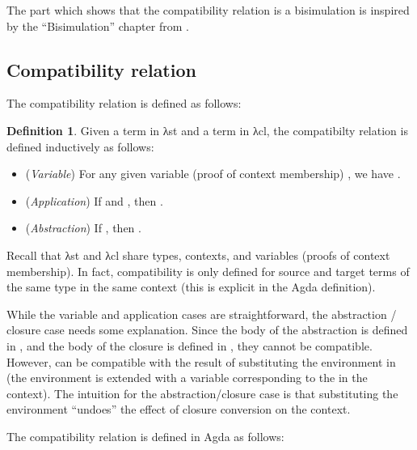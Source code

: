 \documentclass[bsc,frontabs,oneside,singlespacing,parskip,deptreport]{infthesis}
\theoremstyle{definition}
\newtheorem*{definition}{Definition}
\theoremstyle{lemma}
\begin{document}
The part which shows that the compatibility relation is a bisimulation
is inspired by the ``Bisimulation'' chapter from
\cite{DBLP:conf/sbmf/Wadler18}. 

\subsection{Compatibility relation}
\label{sec:comp-rel}

The compatibility relation is defined as follows:

\begin{definition}
  Given a term  in λst and a term  in λcl,
  the compatibilty relation  is defined inductively as
  follows:

  \begin{itemize}
  \item (\textit{Variable}) For any given variable (proof of context
    membership) , we have .

  \item (\textit{Application}) If  and ,
    then .

  \item (\textit{Abstraction}) If , then
    .
    
  \end{itemize}
\end{definition}

Recall that λst and λcl share types, contexts, and variables (proofs
of context membership). In fact, compatibility is only defined for source
and target terms of the same type in the same context (this is
explicit in the Agda definition).

While the variable and application cases are straightforward, the
abstraction / closure case needs some explanation. Since the body
 of the abstraction is defined in , and the body of
the closure  is defined in , they cannot be
compatible. However,  can be compatible with the result of
substituting the environment  in  (the environment is
extended with a variable corresponding to the  in the
context). The intuition for the abstraction/closure case is that
substituting the environment ``undoes'' the effect of closure conversion
on the context. 

The compatibility relation is defined in Agda as follows:

\end{document}

